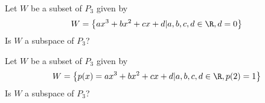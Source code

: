 \begin{enumialphparenastyle}
\begin{ex} Let $W$ be a subset of $P_3$ given by 
\[
W = \left\{ 
ax^3 + bx^2 + cx + d | a,b,c,d \in \R, d = 0 \right\}
\]
Is $W$ a subspace of $P_3$?
\end{ex}

\begin{ex} Let $W$ be a subset of $P_3$ given by 
\[
W = \left\{ 
p(x) = ax^3 + bx^2 + cx + d | a,b,c,d \in \R, p(2) = 1 \right\}
\]
Is $W$ a subspace of $P_3$?
\end{ex}

\end{enumialphparenastyle}